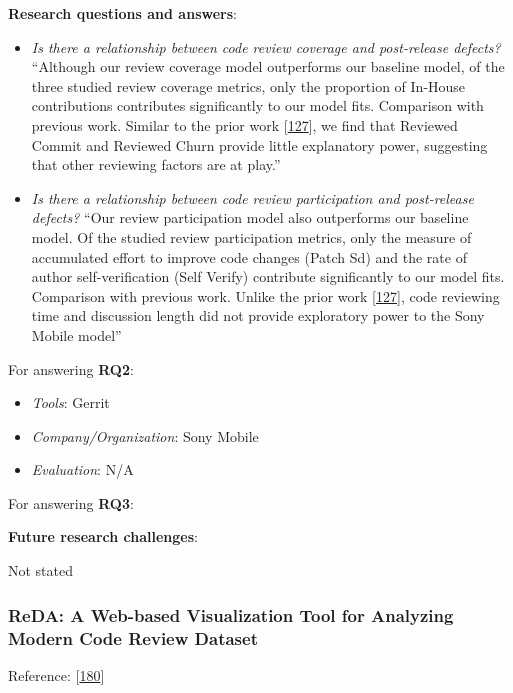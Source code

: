 \documentclass[]{book}
\providecommand{\tightlist}{%
  \setlength{\itemsep}{0pt}\setlength{\parskip}{0pt}}
\begin{document}
\textbf{Research questions and answers}:

\begin{itemize}
\item
  \emph{Is there a relationship between code review coverage and
  post-release defects?} ``Although our review coverage model
  outperforms our baseline model, of the three studied review coverage
  metrics, only the proportion of In-House contributions contributes
  significantly to our model fits. Comparison with previous work.
  Similar to the prior work
  {[}\protect\hyperlink{ref-mcintosh2016empirical}{127}{]}, we find that
  Reviewed Commit and Reviewed Churn provide little explanatory power,
  suggesting that other reviewing factors are at play.''
\item
  \emph{Is there a relationship between code review participation and
  post-release defects?} ``Our review participation model also
  outperforms our baseline model. Of the studied review participation
  metrics, only the measure of accumulated effort to improve code
  changes (Patch Sd) and the rate of author self-verification (Self
  Verify) contribute significantly to our model fits. Comparison with
  previous work. Unlike the prior work
  {[}\protect\hyperlink{ref-mcintosh2016empirical}{127}{]}, code
  reviewing time and discussion length did not provide exploratory power
  to the Sony Mobile model''
\end{itemize}

For answering \textbf{RQ2}:

\begin{itemize}
\tightlist
\item
  \emph{Tools}: Gerrit
\item
  \emph{Company/Organization}: Sony Mobile
\item
  \emph{Evaluation}: N/A
\end{itemize}

For answering \textbf{RQ3}:

\textbf{Future research challenges}:

Not stated

\subsubsection{ReDA: A Web-based Visualization Tool for Analyzing Modern
Code Review
Dataset}\label{reda-a-web-based-visualization-tool-for-analyzing-modern-code-review-dataset}

Reference: {[}\protect\hyperlink{ref-thongtanunam2014reda}{180}{]}
\end{document}
